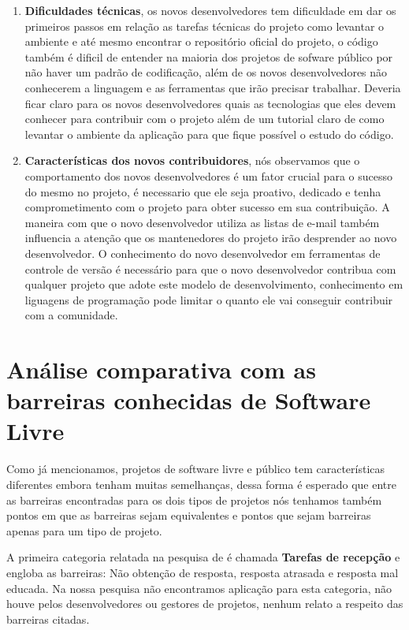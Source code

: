 \begin{enumerate}
\item \textbf{Dificuldades técnicas}, os novos desenvolvedores tem dificuldade em dar os
primeiros passos em relação as tarefas técnicas do projeto como levantar o ambiente e até
mesmo encontrar o repositório oficial do projeto, o código também é dificil de entender
na maioria dos projetos de sofware público por não haver um padrão de codificação, além de 
os novos desenvolvedores não conhecerem a linguagem e as ferramentas que irão precisar trabalhar.
Deveria ficar claro para os novos desenvolvedores quais as tecnologias que eles 
devem conhecer para contribuir com o projeto além de um tutorial claro de como levantar 
o ambiente da aplicação para que fique possível o estudo do código.

\item \textbf{Características dos novos contribuidores}, nós observamos que o comportamento 
dos novos desenvolvedores é um fator crucial para o sucesso do mesmo no projeto, é necessario
que ele seja proativo, dedicado e tenha comprometimento com o projeto para obter sucesso
em sua contribuição. A maneira com que o novo desenvolvedor utiliza as listas de e-mail
também influencia a atenção que os mantenedores do projeto irão desprender ao novo
desenvolvedor. O conhecimento do novo desenvolvedor em ferramentas de controle de versão
é necessário para que o novo desenvolvedor contribua com qualquer projeto que adote este
modelo de desenvolvimento, conhecimento em liguagens de programação pode limitar o quanto ele 
vai conseguir contribuir com a comunidade.

\end{enumerate}

\section{Análise comparativa com as barreiras conhecidas de Software Livre}

Como já mencionamos, projetos de software livre e público tem características 
diferentes embora tenham muitas semelhanças, dessa forma é esperado que entre as
barreiras encontradas para os dois tipos de projetos nós tenhamos também pontos 
em que as barreiras sejam equivalentes e pontos que sejam barreiras apenas para
um tipo de projeto.

A primeira categoria relatada na pesquisa de  é chamada \textbf{Tarefas
de recepção} e engloba as barreiras: Não obtenção de resposta, resposta atrasada e
resposta mal educada. Na nossa pesquisa não encontramos aplicação para esta categoria,
não houve pelos desenvolvedores ou gestores de projetos, nenhum relato a respeito das 
barreiras citadas.

